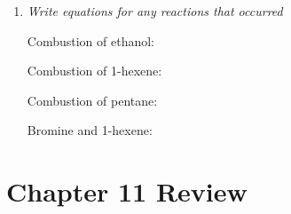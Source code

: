\documentclass{report}
\begin{document}
\begin{enumerate}
\begin{enumerate}
				\item \textit{Write equations for any reactions that occurred}

					Combustion of ethanol: 

					Combustion of 1-hexene: 

					Combustion of pentane: 

					Bromine and 1-hexene: 

			\end{enumerate}

	\end{enumerate}

\newpage

\chapter*{Chapter 11 Review}
\end{document}

